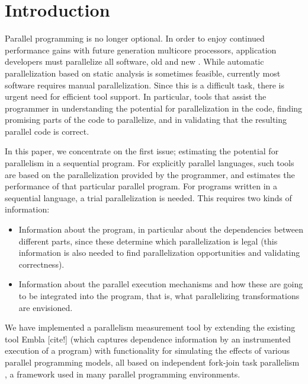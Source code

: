 \section{Introduction}

Parallel programming is no longer optional.  In order to enjoy continued
performance gains with future generation multicore processors,
application developers must parallelize all software, old and
new
.  
While automatic parallelization based on static analysis 
is sometimes feasible, currently most software requires manual
parallelization.
Since this is a difficult task, there is urgent need for efficient tool support. 
In particular, tools that assist the programmer in understanding the potential 
for parallelization in the code, finding promising parts of the code to parallelize, 
and in validating that the resulting parallel code is correct.

In this paper, we concentrate on the first issue; estimating the potential 
for parallelism in a sequential program. For explicitly parallel languages, 
such tools are based on the parallelization provided by the programmer, and 
estimates the performance of that particular parallel program. For programs written
in a sequential language,
a trial parallelization is needed. This requires two kinds of information:
\begin{itemize}
\item
Information about the program, in particular about the dependencies between 
different parts, since these determine which parallelization is legal (this 
information is also needed to find parallelization opportunities and validating 
correctness).
\item
Information about the parallel execution mechanisms and how these are going
to be integrated into the program, that is, what parallelizing transformations 
are envisioned.
\end{itemize}
We have implemented a parallelism measurement tool by extending the existing
tool Embla [cite!] (which captures dependence information by an instrumented 
execution of a program) with functionality for simulating the effects of various parallel 
programming models, all based on independent fork-join task parallelism
, a framework used in many parallel programming environments.

